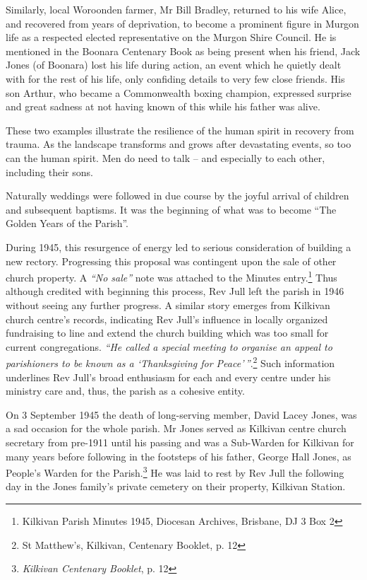 Similarly, local Woroonden farmer, Mr Bill Bradley, returned to his wife Alice, and recovered from years of deprivation, to become a prominent figure in Murgon life as a respected elected representative on the Murgon Shire Council. He is mentioned in the Boonara Centenary Book as being present when his friend, Jack Jones (of Boonara) lost his life during action, an event which he quietly dealt with for the rest of his life, only confiding details to very few close friends. His son Arthur, who became a Commonwealth boxing champion, expressed surprise and great sadness at not having known of this while his father was alive.



These two examples illustrate the resilience of the human spirit in recovery from trauma. As the landscape transforms and grows after devastating events, so too can the human spirit. Men do need to talk -- and especially to each other, including their sons.



Naturally weddings were followed in due course by the joyful arrival of children and subsequent baptisms. It was the beginning of what was to become ``The Golden Years of the Parish''.



During 1945, this resurgence of energy led to serious consideration of building a new rectory. Progressing this proposal was contingent upon the sale of other church property. A \emph{``No sale''} note was attached to the Minutes entry.\footnote{Kilkivan Parish Minutes 1945, Diocesan Archives, Brisbane, DJ 3 Box 2} Thus although credited with beginning this process, Rev Jull left the parish in 1946 without seeing any further progress. A similar story emerges from Kilkivan church centre's records, indicating Rev Jull's influence in locally organized fundraising to line and extend the church building which was too small for current congregations. \emph{``He called a special meeting to organise an appeal to parishioners to be known as a `Thanksgiving for Peace'\,''}.\footnote{St Matthew's, Kilkivan, Centenary Booklet, p. 12} Such information underlines Rev Jull's broad enthusiasm for each and every centre under his ministry care and, thus, the parish as a cohesive entity.


On 3 September 1945 the death of long-serving member, David Lacey Jones, was a sad occasion for the whole parish. Mr Jones served as Kilkivan centre church secretary from pre-1911 until his passing and was a Sub-Warden for Kilkivan for many years before following in the footsteps of his father, George Hall Jones, as People's Warden for the Parish.\footnote{\emph{Kilkivan Centenary Booklet}, p. 12} He was laid to rest by Rev Jull the following day in the Jones family's private cemetery on their property, Kilkivan Station.


